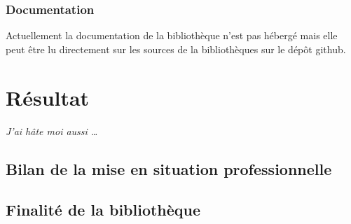 \documentclass[11pt,a4paper,krantz2,11pt,oneside]{krantz}
\newenvironment{Shaded}{\begin{snugshade}}{\end{snugshade}}
\newcommand{\DecValTok}[1]{\textcolor[rgb]{0.06,0.06,0.06}{#1}}
\newcommand{\KeywordTok}[1]{\textcolor[rgb]{0.27,0.27,0.27}{\textbf{#1}}}
\newcommand{\NormalTok}[1]{#1}
\newcommand{\OtherTok}[1]{\textcolor[rgb]{0.37,0.37,0.37}{#1}}
\newcommand{\StringTok}[1]{\textcolor[rgb]{0.5,0.5,0.5}{#1}}
\begin{document}
\begin{Shaded}
\end{Shaded}

\hypertarget{documentation}{%
\subsection{Documentation}\label{documentation}}

Actuellement la documentation de la bibliothèque n'est pas hébergé mais elle peut être lu directement sur les sources de la bibliothèques sur le dépôt github.

\hypertarget{res}{%
\chapter{Résultat}\label{res}}

\emph{J'ai hâte moi aussi \ldots{}}

\hypertarget{bilan-de-la-mise-en-situation-professionnelle}{%
\section{Bilan de la mise en situation professionnelle}\label{bilan-de-la-mise-en-situation-professionnelle}}

\hypertarget{finalituxe9-de-la-bibliothuxe8que}{%
\section{Finalité de la bibliothèque}\label{finalituxe9-de-la-bibliothuxe8que}}
\end{document}
